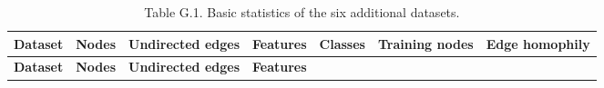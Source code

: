 \begin{longtable}[]{@{}
  >{\raggedright\arraybackslash}p{}
  >{\centering\arraybackslash}p{}
  >{\centering\arraybackslash}p{}
  >{\centering\arraybackslash}p{}
  >{\centering\arraybackslash}p{}
  >{\centering\arraybackslash}p{}
  >{\centering\arraybackslash}p{}@{}}
\caption{Table G.1. Basic statistics of the six additional datasets.}\tabularnewline
\toprule\noalign{}
\begin{minipage}[b]{\linewidth}\raggedright
\textbf{Dataset}
\end{minipage} & \begin{minipage}[b]{\linewidth}\centering
\textbf{Nodes}
\end{minipage} & \begin{minipage}[b]{\linewidth}\centering
\textbf{Undirected edges}
\end{minipage} & \begin{minipage}[b]{\linewidth}\centering
\textbf{Features}
\end{minipage} & \begin{minipage}[b]{\linewidth}\centering
\textbf{Classes}
\end{minipage} & \begin{minipage}[b]{\linewidth}\centering
\textbf{Training nodes}
\end{minipage} & \begin{minipage}[b]{\linewidth}\centering
\textbf{Edge homophily}
\end{minipage} \\
\midrule\noalign{}
\endfirsthead
\toprule\noalign{}
\begin{minipage}[b]{\linewidth}\raggedright
\textbf{Dataset}
\end{minipage} & \begin{minipage}[b]{\linewidth}\centering
\textbf{Nodes}
\end{minipage} & \begin{minipage}[b]{\linewidth}\centering
\textbf{Undirected edges}
\end{minipage} & \begin{minipage}[b]{\linewidth}\centering
\textbf{Features}
\end{minipage} & \begin{minipage}[b]{\linewidth}\centering

\end{minipage}
\end{longtable}
